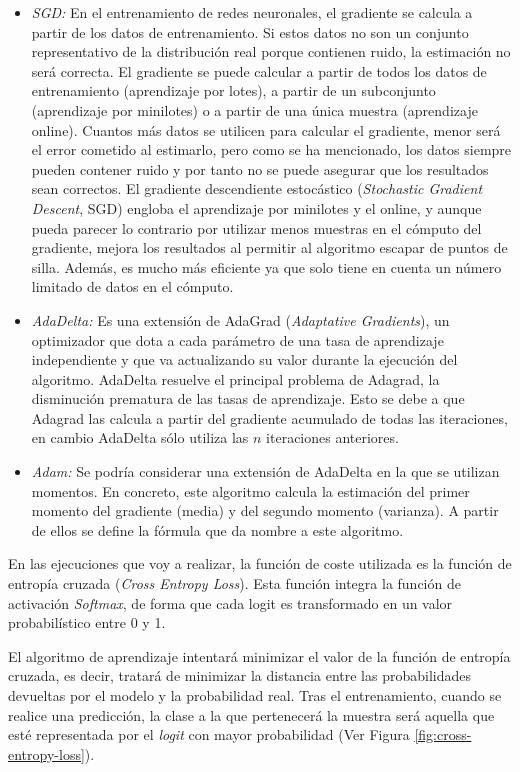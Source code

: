 \begin{itemize}
    \begin{itemize}
        \item \textit{SGD:} En el entrenamiento de redes neuronales, el gradiente se calcula a partir de los datos de entrenamiento. Si estos datos no son un conjunto representativo de la distribución real porque contienen ruido, la estimación no será correcta. El gradiente se puede calcular a partir de todos los datos de entrenamiento (aprendizaje por lotes), a partir de un subconjunto (aprendizaje por minilotes) o a partir de una única muestra (aprendizaje online). Cuantos más datos se utilicen para calcular el gradiente, menor será el error cometido al estimarlo, pero como se ha mencionado, los datos siempre pueden contener ruido y por tanto no se puede asegurar que los resultados sean correctos. El gradiente descendiente estocástico (\textit{Stochastic Gradient Descent}, SGD) engloba el aprendizaje por minilotes y el online, y aunque pueda parecer lo contrario por utilizar menos muestras en el cómputo del gradiente, mejora los resultados al permitir al algoritmo escapar de puntos de silla. Además, es mucho más eficiente ya que solo tiene en cuenta un número limitado de datos en el cómputo.
        \item \textit{AdaDelta:} Es una extensión de AdaGrad (\textit{Adaptative Gradients}), un optimizador que dota a cada parámetro de una tasa de aprendizaje independiente y que va actualizando su valor durante la ejecución del algoritmo. AdaDelta resuelve el principal problema de Adagrad, la disminución prematura de las tasas de aprendizaje. Esto se debe a que Adagrad las calcula a partir del gradiente acumulado de todas las iteraciones, en cambio AdaDelta sólo utiliza las $n$ iteraciones anteriores.
        \item \textit{Adam:} Se podría considerar una extensión de AdaDelta en la que se utilizan momentos. En concreto, este algoritmo calcula la estimación del primer momento del gradiente (media) y del segundo momento (varianza). A partir de ellos se define la fórmula que da nombre a este algoritmo.
    \end{itemize}
\end{itemize}

En las ejecuciones que voy a realizar, la función de coste utilizada es la función de entropía cruzada (\textit{Cross Entropy Loss}). Esta función integra la función de activación \textit{Softmax}, de forma que cada logit es transformado en un valor probabilístico entre 0 y 1. 

El algoritmo de aprendizaje intentará minimizar el valor de la función de entropía cruzada, es decir, tratará de minimizar la distancia entre las probabilidades devueltas por el modelo y la probabilidad real. Tras el entrenamiento, cuando se realice una predicción, la clase a la que pertenecerá la muestra será aquella que esté representada por el \textit{logit} con mayor probabilidad (Ver Figura \ref{fig:cross-entropy-loss}). \cite{crossentropyloss}


